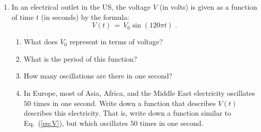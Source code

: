 \documentclass[12pt]{article}
\begin{document}
\begin{enumerate}
\item In an electrical outlet in the US, the voltage $V$ (in volts) is
  given as a function of time $t$ (in seconds) by the formula:
  \begin{equation}
    V(t) \, = \, V_0 \sin(120\pi t) \;.
    \label{eq:V}
  \end{equation}
  \begin{enumerate}
  \item What does $V_0$ represent in terms of voltage?
  \item What is the period of this function?
  \item How many oscillations are there in one second?
  \item In Europe, most of Asia, Africa, and the Middle East
    electricity oscillates $50$ times in one second. Write down a
    function that describes $V(t)$ describes this electricity. That
    is, write down a function similar to Eq.~(\ref{eq:V}), but which
    oscillates $50$ times in one second.
  \end{enumerate}

  
\end{enumerate}
\end{document}

